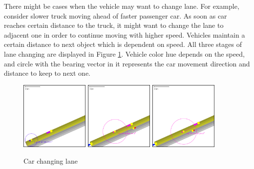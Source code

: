 There might be cases when the vehicle may want to change lane. For example, consider slower truck moving ahead of faster passenger car. As soon as car reaches certain distance to the truck, it might want to change the lane to adjacent one in order to continue moving with higher speed. Vehicles maintain a certain distance to next object which is dependent on speed. All three stages of lane changing are displayed in Figure \ref{fig:carKeepingDistance}. Vehicle color hue depends on the speed, and circle with the bearing vector in it represents the car movement direction and distance to keep to next one.
\begin{figure}[!h]
    \vspace{1.5em}
    \caption{Car changing lane}
    \label{fig:carKeepingDistance}
    \centering
    \includegraphics[width=0.3\textwidth]{figs/carMovement/car_keeping_distance_to_other.png}
    \hspace{0.2em}
    \includegraphics[width=0.3\textwidth]{figs/carMovement/car_lane_change_before.png}
    \hspace{0.2em}
    \includegraphics[width=0.3\textwidth]{figs/carMovement/car_lane_change_after.png}
    \vspace{1.5em}
\end{figure}


